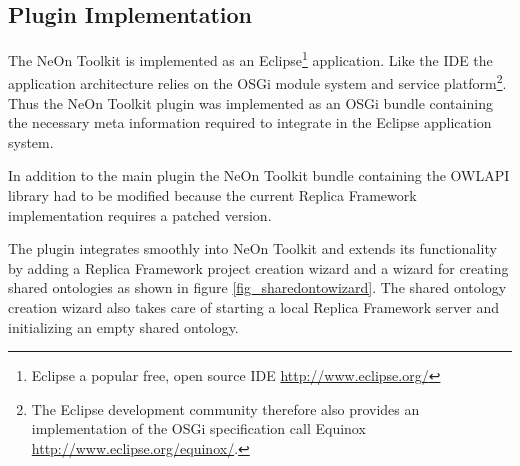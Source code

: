 \subsection{Plugin Implementation}
The NeOn Toolkit is implemented as an Eclipse\footnote{Eclipse a popular
free, open source IDE \url{http://www.eclipse.org/}} application. Like
the IDE the application architecture relies on the OSGi module system and
service platform\footnote{The Eclipse development community therefore also provides an
implementation of the OSGi specification call Equinox \url{http://www.eclipse.org/equinox/}.}.
Thus the NeOn Toolkit plugin was implemented as an OSGi bundle containing
the necessary meta information required to integrate in the Eclipse
application system.

In addition to the main plugin the NeOn Toolkit bundle containing
the OWLAPI library had to be modified because the current Replica Framework
implementation requires a patched version.

The plugin integrates smoothly into NeOn Toolkit and extends its functionality
by adding a Replica Framework project creation wizard and a wizard for
creating shared ontologies as shown in figure \ref{fig_sharedontowizard}.
The shared ontology creation wizard also takes care of starting a local Replica Framework server and
initializing an empty shared ontology.

